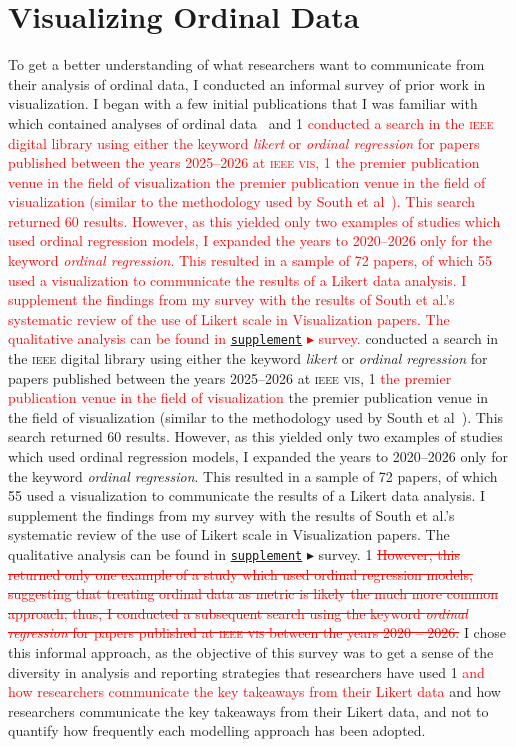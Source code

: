 \documentclass{vgtc}                          %
\def\trackchanges{0}
\newcommand{\new}[1]{%
\if\trackchanges1%
\textcolor{red}{#1}%
\else#1\fi}
\newcommand{\stout}[1]{\if\trackchanges1 \textcolor{red}{\sout{#1}} \fi}
\newcommand{\supplement}{\href{https://osf.io/cdgby/}{\texttt{supplement}}}
\begin{document}
\section{Visualizing Ordinal Data}
\label{sec:reporting-strategies}

To get a better understanding of what researchers want to communicate from their analysis of ordinal data, I conducted an informal survey of prior work in visualization.
I began with a few initial publications that I was familiar with which contained analyses of ordinal data~\cite[e.g.,][]{sarma_evaluating_2023, yang_dice_2024, yang_swaying_2024, nadib_guardrail_2026, lisnic_visualization_2025} and \new{conducted a search in the \textsc{ieee} digital library using either the keyword \textit{likert} or \textit{ordinal regression} for papers published between the years 2025--2026 at \textsc{ieee vis}, \new{the premier publication venue in the field of visualization} (similar to the methodology used by South et al~\cite{south_effective_2022}). This search returned 60 results. However, as this yielded only two examples of studies which used ordinal regression models, I expanded the years to 2020--2026 only for the keyword \textit{ordinal regression}. This resulted in a sample of 72 papers, of which 55 used a visualization to communicate the results of a Likert data analysis. I supplement the findings from my survey with the results of South et al.'s~\cite{south_effective_2022} systematic review of the use of Likert scale in Visualization papers. The qualitative analysis can be found in \supplement{} $\blacktriangleright$ survey.}
\stout{However, this returned only one example of a study which used ordinal regression models, suggesting that treating ordinal data as metric is likely the much more common approach; thus, I conducted a subsequent search using the keyword \textit{ordinal regression} for papers published at \textsc{ieee vis} between the years 2020 -- 2026.}%
I chose this informal approach, as the objective of this survey was to get a sense of the diversity in analysis and reporting strategies that researchers have used \new{and how researchers communicate the key takeaways from their Likert data}, and not to quantify how frequently each modelling approach has been adopted. 
\end{document}
